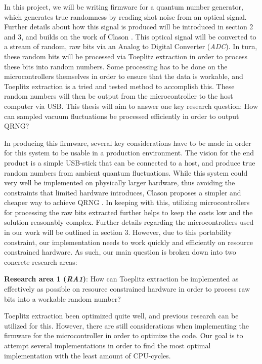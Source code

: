 \documentclass{sigchi}
\begin{document}
In this project, we will be writing firmware for a quantum number generator, which generates true randomness by reading shot noise from an optical signal. Further details about how this signal is produced will be introduced in section 2 and 3, and builds on the work of Clason \cite{Clason2023}. This optical signal will be converted to a stream of random, raw bits via an Analog to Digital Converter (\emph{ADC}). In turn, these random bits will be processed via Toeplitz extraction \cite{toeplitz} in order to process these bits into random numbers. Some processing has to be done on the microcontrollers themselves in order to ensure that the data is workable, and Toeplitz extraction is a tried and tested method to accomplish this. These random numbers will then be output from the microcontroller to the host computer via USB. This thesis will aim to answer one key research question: How can sampled vacuum fluctuations be processed efficiently in order to output QRNG?

In producing this firmware, several key considerations have to be made in order for this system to be usable in a production environment. The vision for the end product is a simple USB-stick that can be connected to a host, and produce true random numbers from ambient quantum fluctuations. While this system could very well be implemented on physically larger hardware, thus avoiding the constraints that limited hardware introduces, Clason proposes a simpler and cheaper way to achieve QRNG \cite{Clason2023}. In keeping with this, utilizing microcontrollers for processing the raw bits extracted further helps to keep the costs low and the solution reasonably complex. Further details regarding the microcontrollers used in our work will be outlined in section 3. However, due to this portability constraint, our implementation needs to work quickly and efficiently on resource constrained hardware. As such, our main question is broken down into two concrete research areas:

\textbf{Research area 1 (\emph{RA1})}: How can Toeplitz extraction be implemented as effectively as possible on resource constrained hardware in order to process raw bits into a workable random number?

Toeplitz extraction been optimized quite well, and previous research can be utilized for this. However, there are still considerations when implementing the firmware for the microcontroller in order to optimize the code. Our goal is to attempt several implementations in order to find the most optimal implementation with the least amount of CPU-cycles.
\end{document}
